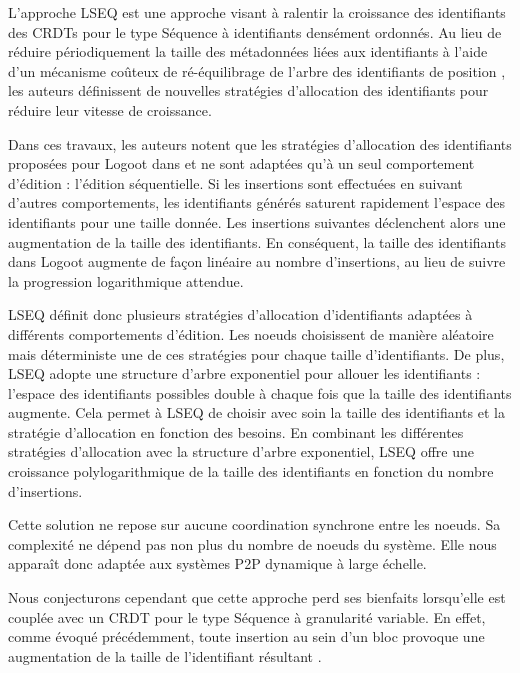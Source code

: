 L'approche LSEQ \cite{lseq2013, lseq2017} est une approche visant à ralentir la croissance des identifiants des \acp{CRDT} pour le type Séquence à identifiants densément ordonnés.
Au lieu de réduire périodiquement la taille des métadonnées liées aux identifiants à l'aide d'un mécanisme coûteux de ré-équilibrage de l'arbre des identifiants de position \cite{zawirski:hal-01248197}, les auteurs définissent de nouvelles stratégies d'allocation des identifiants pour réduire leur vitesse de croissance.

Dans ces travaux, les auteurs notent que les stratégies d'allocation des identifiants proposées pour Logoot dans \cite{2009-logoot-weiss} et \cite{2010-logoot-undo-weiss} ne sont adaptées qu'à un seul comportement d'édition : l'édition séquentielle.
Si les insertions sont effectuées en suivant d'autres comportements, les identifiants générés saturent rapidement l'espace des identifiants pour une taille donnée.
Les insertions suivantes déclenchent alors une augmentation de la taille des identifiants.
En conséquent, la taille des identifiants dans Logoot augmente de façon linéaire au nombre d'insertions, au lieu de suivre la progression logarithmique attendue.

LSEQ définit donc plusieurs stratégies d'allocation d'identifiants adaptées à différents comportements d'édition.
Les noeuds choisissent de manière aléatoire mais déterministe une de ces stratégies pour chaque taille d'identifiants.
De plus, LSEQ adopte une structure d'arbre exponentiel pour allouer les identifiants : l'espace des identifiants possibles double à chaque fois que la taille des identifiants augmente.
Cela permet à LSEQ de choisir avec soin la taille des identifiants et la stratégie d'allocation en fonction des besoins.
En combinant les différentes stratégies d'allocation avec la structure d'arbre exponentiel, LSEQ offre une croissance polylogarithmique de la taille des identifiants en fonction du nombre d'insertions.

Cette solution ne repose sur aucune coordination synchrone entre les noeuds.
Sa complexité ne dépend pas non plus du nombre de noeuds du système.
Elle nous apparaît donc adaptée aux systèmes \ac{P2P} dynamique à large échelle.

Nous conjecturons cependant que cette approche perd ses bienfaits lorsqu'elle est couplée avec un \ac{CRDT} pour le type Séquence à granularité variable.
En effet, comme évoqué précédemment, toute insertion au sein d'un bloc provoque une augmentation de la taille de l'identifiant résultant .

